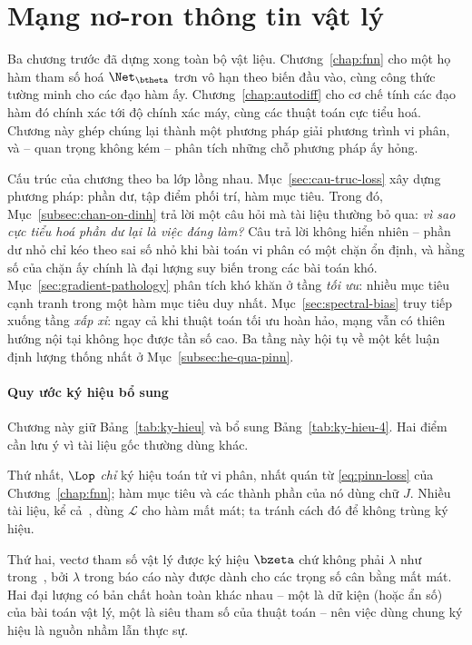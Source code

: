 \chapter{Mạng nơ-ron thông tin vật lý}
\label{chap:pinn}
 
Ba chương trước đã dựng xong toàn bộ vật liệu. Chương~\ref{chap:fnn} cho một họ
hàm tham số hoá $\Net_{\btheta}$ trơn vô hạn theo biến đầu vào, cùng công thức
tường minh cho các đạo hàm ấy. Chương~\ref{chap:autodiff} cho cơ chế tính các đạo
hàm đó chính xác tới độ chính xác máy, cùng các thuật toán cực tiểu hoá. Chương
này ghép chúng lại thành một phương pháp giải phương trình vi phân, và -- quan
trọng không kém -- phân tích những chỗ phương pháp ấy hỏng.
 
Cấu trúc của chương theo ba lớp lồng nhau. Mục~\ref{sec:cau-truc-loss} xây dựng
phương pháp: phần dư, tập điểm phối trí, hàm mục tiêu. Trong đó,
Mục~\ref{subsec:chan-on-dinh} trả lời một câu hỏi mà tài liệu thường bỏ qua:
\emph{vì sao cực tiểu hoá phần dư lại là việc đáng làm?} Câu trả lời không hiển
nhiên -- phần dư nhỏ chỉ kéo theo sai số nhỏ khi bài toán vi phân có một chặn ổn
định, và hằng số của chặn ấy chính là đại lượng suy biến trong các bài toán khó.
Mục~\ref{sec:gradient-pathology} phân tích khó khăn ở tầng \emph{tối ưu}: nhiều
mục tiêu cạnh tranh trong một hàm mục tiêu duy nhất.
Mục~\ref{sec:spectral-bias} truy tiếp xuống tầng \emph{xấp xỉ}: ngay cả khi thuật
toán tối ưu hoàn hảo, mạng vẫn có thiên hướng nội tại không học được tần số cao.
Ba tầng này hội tụ về một kết luận định lượng thống nhất ở
Mục~\ref{subsec:he-qua-pinn}.
 
\subsubsection*{Quy ước ký hiệu bổ sung}
 
Chương này giữ Bảng~\ref{tab:ky-hieu} và bổ sung Bảng~\ref{tab:ky-hieu-4}. Hai
điểm cần lưu ý vì tài liệu gốc thường dùng khác.
 
Thứ nhất, $\Lop$ \emph{chỉ} ký hiệu toán tử vi phân, nhất quán từ
\eqref{eq:pinn-loss} của Chương~\ref{chap:fnn}; hàm mục tiêu và các thành phần
của nó dùng chữ $J$. Nhiều tài liệu, kể cả~\cite{wang2021}, dùng $\mathcal{L}$
cho hàm mất mát; ta tránh cách đó để không trùng ký hiệu.
 
Thứ hai, vectơ tham số vật lý được ký hiệu $\bzeta$ chứ không phải $\lambda$ như
trong~\cite{raissi2019}, bởi $\lambda$ trong báo cáo này được dành cho các trọng
số cân bằng mất mát. Hai đại lượng có bản chất hoàn toàn khác nhau -- một là dữ
kiện (hoặc ẩn số) của bài toán vật lý, một là siêu tham số của thuật toán -- nên
việc dùng chung ký hiệu là nguồn nhầm lẫn thực sự.
 

